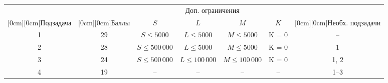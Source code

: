 \begin{center}
\renewcommand{\arraystretch}{1.5}
\begin{tabular}{|c|c|c|c|c|c|c|}
\hline
& & \multicolumn{4}{c|}{Доп. ограничения} & \\
\cline{3-6}
\raisebox{2.25ex}[0cm][0cm]{Подзадача}
& \raisebox{2.25ex}[0cm][0cm]{Баллы}
& $S$ & $L$ & $M$ & $K$ 
& \raisebox{2.25ex}[0cm][0cm]{\parbox{2cm}{\centering Необх. подзадачи}} 
\\ \hline
1  & 29 & $S \leq 5000$     & $L \leq 5000$     & $M \leq 5000$     & K = 0 & --    \\  \hline
2  & 28 & $S \leq 500\,000$ & $L \leq 5000$     & $M \leq 5000$     & K = 0 & 1     \\  \hline
3  & 24 & $S \leq 500\,000$ & $L \leq 100\,000$ & $M \leq 100\,000$ & K = 0 & 1, 2  \\  \hline
4  & 19 & -- & -- & -- & -- & 1--3 \\  \hline
\end{tabular}
\end{center}